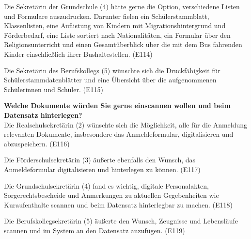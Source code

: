 Die Sekretärin der Grundschule (4) hätte gerne die Option, verschiedene Listen und Formulare auszudrucken. Darunter fielen ein Schülerstammblatt, Klassenlisten, eine Auflistung von Kindern mit Migrationshintergrund und Förderbedarf, eine Liste sortiert nach Nationalitäten, ein Formular über den Religionsunterricht und einen Gesamtüberblick über die mit dem Bus fahrenden Kinder einschließlich ihrer Bushaltestellen. (E114)

Die Sekretärin des Berufskollegs (5) wünschte sich die Druckfähigkeit für Schülerstammdatenblätter und eine Übersicht über die aufgenommenen Schülerinnen und Schüler. (E115)

\textbf{Welche Dokumente würden Sie gerne einscannen wollen und beim Datensatz hinterlegen?}\\
Die Realschulsekretärin (2) wünschte sich die Möglichkeit, alle für die Anmeldung relevanten Dokumente, insbesondere das Anmeldeformular, digitalisieren und abzuspeichern. (E116)

Die Förderschulsekretärin (3) äußerte ebenfalls den Wunsch, das Anmeldeformular digitalisieren und hinterlegen zu können. (E117)

Die Grundschulsekretärin (4) fand es wichtig, digitale Personalakten, Sorgerechtsbescheide und Anmerkungen zu aktuellen Gegebenheiten wie Kuraufenthalte scannen und beim Datensatz hinterlegbar zu machen. (E118)

Die Berufskollegsekretärin (5) äußerte den Wunsch, Zeugnisse und Lebensläufe scannen und im System an den Datensatz anzufügen. (E119)
